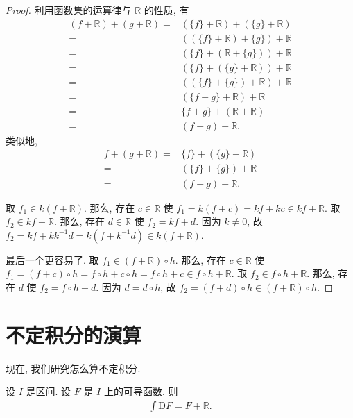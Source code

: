 \begin{proof}
    利用函数集的运算律与 $\mathbb{R}$ 的性质, 有
    \begin{align*}
        (f + \mathbb{R}) + (g + \mathbb{R})
        = {} & (\{ f \} + \mathbb{R}) + (\{ g \} + \mathbb{R}) \\
        = {} & ((\{ f \} + \mathbb{R}) + \{ g \}) + \mathbb{R} \\
        = {} & (\{ f \} + (\mathbb{R} + \{ g \})) + \mathbb{R} \\
        = {} & (\{ f \} + (\{ g \} + \mathbb{R})) + \mathbb{R} \\
        = {} & ((\{ f \} + \{ g \}) + \mathbb{R}) + \mathbb{R} \\
        = {} & (\{ f + g \} + \mathbb{R}) + \mathbb{R}         \\
        = {} & \{ f + g \} + (\mathbb{R} + \mathbb{R})         \\
        = {} & (f + g) + \mathbb{R}.
    \end{align*}
    类似地,
    \begin{align*}
        f + (g + \mathbb{R})
        = {} & \{ f \} + (\{ g \} + \mathbb{R}) \\
        = {} & (\{ f \} + \{ g \}) + \mathbb{R} \\
        = {} & (f + g) + \mathbb{R}.
    \end{align*}

    取 $f_1 \in k(f + \mathbb{R})$. 那么, 存在 $c \in \mathbb{R}$ 使 $f_1 = k(f + c) = kf + kc \in kf + \mathbb{R}$. 取 $f_2 \in kf + \mathbb{R}$. 那么, 存在 $d \in \mathbb{R}$ 使 $f_2 = kf + d$. 因为 $k \neq 0$, 故 $f_2 = kf + kk^{-1}d = k(f + k^{-1}d) \in k(f + \mathbb{R})$.

    最后一个更容易了. 取 $f_1 \in (f + \mathbb{R}) \circ h$. 那么, 存在 $c \in \mathbb{R}$ 使 $f_1 = (f + c) \circ h = f \circ h + c \circ h = f \circ h + c \in f \circ h + \mathbb{R}$. 取 $f_2 \in f \circ h + \mathbb{R}$. 那么, 存在 $d$ 使 $f_2 = f \circ h + d$. 因为 $d = d \circ h$, 故 $f_2 = (f + d) \circ h \in (f + \mathbb{R}) \circ h$.
\end{proof}

\section{不定积分的演算}

现在, 我们研究怎么算不定积分.

\begin{theorem}
    设 $I$ 是区间. 设 $F$ 是 $I$ 上的可导函数. 则
    \begin{align*}
        \int {\mathrm{D}F} = F + \mathbb{R}.
    \end{align*}
\end{theorem}

